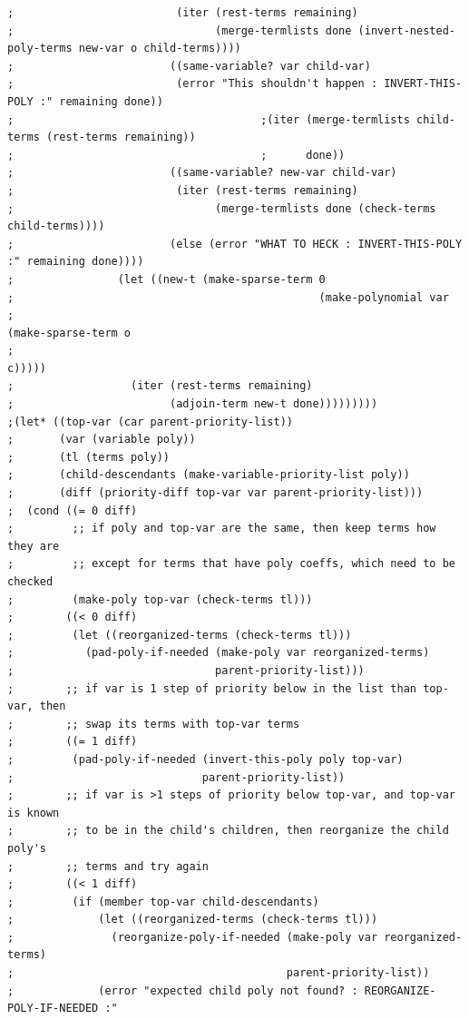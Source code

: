 \documentclass[final,fleqn,titlepage,twoside]{article}
\begin{document}
\begin{verbatim}
;                         (iter (rest-terms remaining)
;                               (merge-termlists done (invert-nested-poly-terms new-var o child-terms))))
;                        ((same-variable? var child-var)
;                         (error "This shouldn't happen : INVERT-THIS-POLY :" remaining done))
;                                      ;(iter (merge-termlists child-terms (rest-terms remaining))
;                                      ;      done))
;                        ((same-variable? new-var child-var)
;                         (iter (rest-terms remaining)
;                               (merge-termlists done (check-terms child-terms))))
;                        (else (error "WHAT TO HECK : INVERT-THIS-POLY :" remaining done))))
;                (let ((new-t (make-sparse-term 0
;                                               (make-polynomial var
;                                                                (make-sparse-term o
;                                                                                  c)))))
;                  (iter (rest-terms remaining)
;                        (adjoin-term new-t done)))))))))
;(let* ((top-var (car parent-priority-list))
;       (var (variable poly))
;       (tl (terms poly))
;       (child-descendants (make-variable-priority-list poly))
;       (diff (priority-diff top-var var parent-priority-list)))
;  (cond ((= 0 diff)
;         ;; if poly and top-var are the same, then keep terms how they are
;         ;; except for terms that have poly coeffs, which need to be checked
;         (make-poly top-var (check-terms tl)))
;        ((< 0 diff)
;         (let ((reorganized-terms (check-terms tl)))
;           (pad-poly-if-needed (make-poly var reorganized-terms)
;                               parent-priority-list)))
;        ;; if var is 1 step of priority below in the list than top-var, then
;        ;; swap its terms with top-var terms
;        ((= 1 diff)
;         (pad-poly-if-needed (invert-this-poly poly top-var)
;                             parent-priority-list))
;        ;; if var is >1 steps of priority below top-var, and top-var is known
;        ;; to be in the child's children, then reorganize the child poly's
;        ;; terms and try again
;        ((< 1 diff)
;         (if (member top-var child-descendants)
;             (let ((reorganized-terms (check-terms tl)))
;               (reorganize-poly-if-needed (make-poly var reorganized-terms)
;                                          parent-priority-list))
;             (error "expected child poly not found? : REORGANIZE-POLY-IF-NEEDED :"

\end{verbatim}
\end{document}
